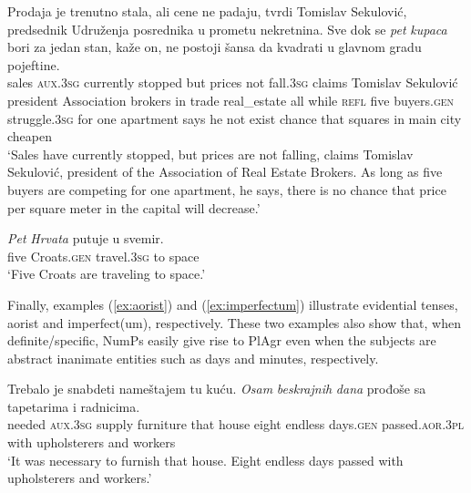 \documentclass[output=paper,colorlinks,citecolor=brown
]{langscibook}
\begin{document}
\ea \label{ex:unspecific-1}
\gll Prodaja je trenutno stala, ali cene ne padaju, tvrdi Tomislav Sekulović, predsednik Udruženja posrednika u prometu nekretnina. Sve dok se \textit{pet} \textit{kupaca} bori za jedan stan, kaže on, ne postoji šansa da kvadrati u glavnom gradu pojeftine.\\
      sales \textsc{aux}.3\textsc{sg} currently stopped but prices not fall.3\textsc{sg} claims Tomislav Sekulović president Association brokers in trade real\_estate all while \textsc{refl} five buyers.\textsc{gen} struggle.\textsc{3sg} for one apartment says he not exist chance that squares in main city cheapen\\
\glt `Sales have currently stopped, but prices are not falling, claims Tomislav Sekulović, president of the Association of Real Estate Brokers. As long as five buyers are competing for one apartment, he says, there is no chance that price per square meter in the capital will decrease.'
\z


\ea \label{ex:unspecific-2}
\gll \textit{Pet} \textit{Hrvata} putuje u svemir.\\ 
      five Croats.\textsc{gen} travel.\textsc{3sg} to space\\
\glt `Five Croats are traveling to space.'
\z


\noindent Finally, examples (\ref{ex:aorist}) and (\ref{ex:imperfectum}) illustrate evidential tenses, aorist and imperfect(um), respectively. These two examples also show that, when definite/specific, NumPs easily give rise to PlAgr even when the subjects are abstract inanimate entities such as days and minutes, respectively.


\ea \label{ex:aorist}
\gll Trebalo je snabdeti nameštajem tu kuću. \textit{Osam} \textit{beskrajnih} \textit{dana} prođoše sa tapetarima i radnicima.\\
      needed \textsc{aux}.3\textsc{sg} supply furniture that house eight endless days.\textsc{gen} passed.\textsc{aor.3pl} with upholsterers and workers\\
\glt `It was necessary to furnish that house. Eight endless days passed with upholsterers and workers.'
\z
\end{document}

